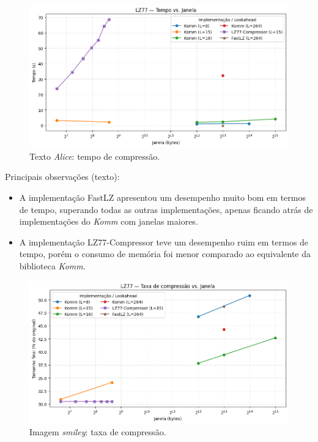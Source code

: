 \begin{figure}[h]
  \centering
  \caption{Texto \textit{Alice}: tempo de compressão.}
  \label{fig:external-alice-time}
  \includegraphics[width=15cm]{figuras/lz77_alice_time_window.png}
\end{figure}

Principais observações (texto):
\begin{itemize}
  \item A implementação FastLZ apresentou um desempenho muito bom em termos de tempo, superando todas as outras implementações, apenas ficando atrás de implementações do \textit{Komm} com janelas maiores.
  \item A implementação LZ77-Compressor teve um desempenho ruim em termos de tempo, porém o consumo de memória foi menor comparado ao equivalente da biblioteca \textit{Komm}.
\end{itemize}

\begin{figure}[h]
  \centering
  \caption{Imagem \textit{smiley}: taxa de compressão.}
  \label{fig:external-smiley-compression}
  \includegraphics[width=15cm]{figuras/lz77_smiley_compression_window.png}
\end{figure}

